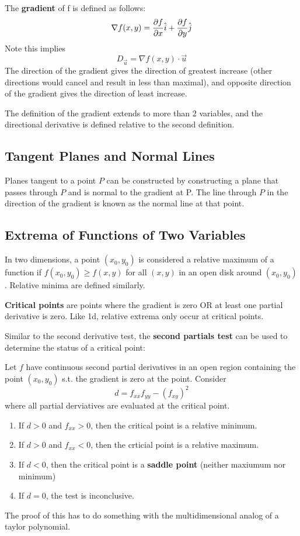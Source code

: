 \documentclass{article}
\begin{document}
The \textbf{gradient} of f is defined as follows:
\[\nabla f(x,y) = \pdv{f}{x} \hat{i} + \pdv{f}{y} \hat{j}\]
Note this implies
\[D_{\vec{u}} = \nabla f(x,y) \cdot \vec{u}\]
The direction of the gradient gives the direction of greatest increase (other directions would cancel and result in less than maximal),
and opposite direction of the gradient gives the direction of least increase.

The definition of the gradient extends to more than 2 variables, and the directional derivative is defined relative to the second definition.

\subsection{Tangent Planes and Normal Lines}
Planes tangent to a point $P$ can be constructed by constructing a plane that passes through $P$ and is normal to the gradient at P.
The line through $P$ in the direction of the gradient is known as the normal line at that point.

\subsection{Extrema of Functions of Two Variables}
In two dimensions, a point $(x_0, y_0)$ is considered a relative maximum of a function if $f(x_0, y_0) \geq f(x,y)$ for all $(x, y)$ in an open disk around $(x_0, y_0)$.
Relative minima are defined similarly.

\textbf{Critical points} are points where the gradient is zero OR at least one partial derivative is zero.
Like 1d, relative extrema only occur at critical points.

Similar to the second derivative test, the \textbf{second partials test} can be used to determine the status of a critical point:
\begin{definition}
    Let $f$ have continuous second partial derivatives in an open region containing the point $(x_0, y_0)$ s.t. the gradient is zero at the point.
    Consider
    \[d = f_{xx} f_{yy} - (f_{xy})^2 \]
    where all partial derviatives are evaluated at the critical point.
    \begin{enumerate}
        \item If $d > 0$ and $f_{xx} > 0$, then the critical point is a relative minimum.
        \item If $d > 0$ and $f_{xx} < 0$, then the crticial point is a relative maximum.
        \item If $d < 0$, then the critical point is a \textbf{saddle point} (neither maxiumum nor minimum)
        \item If $d = 0$, the test is inconclusive.
    \end{enumerate}
\end{definition}
The proof of this has to do something with the multidimensional analog of a taylor polynomial.
\end{document}
